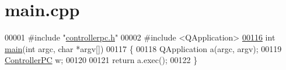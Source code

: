 \hypertarget{main_8cpp_source}{}\section{main.\+cpp}

\begin{DoxyCode}
00001 \textcolor{preprocessor}{#include "\hyperlink{controllerpc_8h}{controllerpc.h}"}
00002 \textcolor{preprocessor}{#include <QApplication>}
\hypertarget{main_8cpp_source.tex_l00116}{}\hyperlink{main_8cpp_a0ddf1224851353fc92bfbff6f499fa97}{00116} \textcolor{keywordtype}{int} \hyperlink{main_8cpp_a0ddf1224851353fc92bfbff6f499fa97}{main}(\textcolor{keywordtype}{int} argc, \textcolor{keywordtype}{char} *argv[])
00117 \{
00118     QApplication a(argc, argv);
00119     \hyperlink{class_controller_p_c}{ControllerPC} w;
00120 
00121     \textcolor{keywordflow}{return} a.exec();
00122 \}
\end{DoxyCode}
